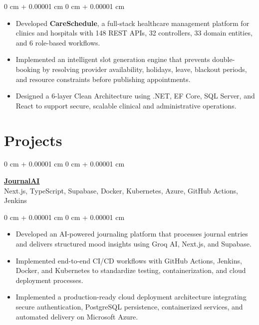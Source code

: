 \documentclass[10pt, letterpaper]{article}
\newenvironment{highlights}{
    \begin{itemize}[
        topsep=0.07 cm,
        parsep=0.045 cm,
        partopsep=0pt,
        itemsep=0pt,
        leftmargin=0 cm + 10pt
    ]
}{
    \end{itemize}
}
\newenvironment{onecolentry}{
    \begin{adjustwidth}{
        0 cm + 0.00001 cm
    }{
        0 cm + 0.00001 cm
    }
}{
    \end{adjustwidth}
}
\newcommand{\muted}[1]{{\color{mutedColor}#1}}
\newcommand{\entryTitle}[1]{\textbf{#1}}
\newcommand{\techStack}[1]{{\small\muted{#1}}}
\let\oldhref\href
\renewcommand{\href}[2]{\oldhref{#1}{\textbf{#2}}}
\begin{document}
\vspace{0.11 cm}

\begin{onecolentry}
\begin{highlights}
    \item Developed \textbf{CareSchedule}, a full-stack healthcare management platform for clinics and hospitals with 148 REST APIs, 32 controllers, 33 domain entities, and 6 role-based workflows.
    \item Implemented an intelligent slot generation engine that prevents double-booking by resolving provider availability, holidays, leave, blackout periods, and resource constraints before publishing appointments.
    \item Designed a 6-layer Clean Architecture using .NET, EF Core, SQL Server, and React to support secure, scalable clinical and administrative operations.
\end{highlights}
\end{onecolentry}

\section{Projects}

\begin{onecolentry}
    \entryTitle{\href{https://github.com/vinithreddybanda/journalai}{JournalAI}}\\
    \techStack{Next.js, TypeScript, Supabase, Docker, Kubernetes, Azure, GitHub Actions, Jenkins}
\end{onecolentry}

\vspace{0.11 cm}
\begin{onecolentry}
    \begin{highlights}
        \item Developed an AI-powered journaling platform that processes journal entries and delivers structured mood insights using Groq AI, Next.js, and Supabase.
        \item Implemented end-to-end CI/CD workflows with GitHub Actions, Jenkins, Docker, and Kubernetes to standardize testing, containerization, and cloud deployment processes.
        \item Implemented a production-ready cloud deployment architecture integrating secure authentication, PostgreSQL persistence, containerized services, and automated delivery on Microsoft Azure.
    \end{highlights}
\end{onecolentry}
\end{document}
